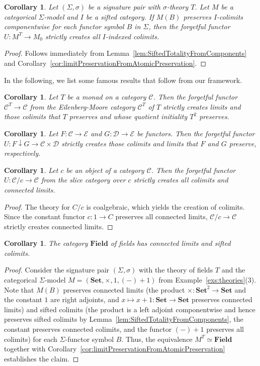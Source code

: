 \documentclass[11pt]{article}
\theoremstyle{plain}
\newtheorem{corollary}[theorem]{Corollary}
\theoremstyle{definition}
\numberwithin{equation}{section}
\newcommand{\C}{\mathcal{C}}
\newcommand{\D}{\mathcal{D}}
\newcommand{\E}{\mathcal{E}}
\newcommand{\Set}{\mathbf{Set}}
\begin{document}
\begin{corollary}\label{cor:liftingSifted}
   Let $(\Sigma, \sigma)$ be a signature pair with $\sigma$-theory $T$. Let $M$ be a categorical $\Sigma$-model and $I$ be a sifted category. If $M(B)$ preserves $I$-colimits componentwise for each functor symbol $B$ in $\Sigma$, then the forgetful functor $U\colon M^T\to M_0$ strictly creates all $I$-indexed colimits. 
\end{corollary}
\begin{proof}
   Follows immediately from Lemma~\ref{lem:SiftedTotalityFromComponents} and Corollary~\ref{cor:limitPreservationFromAtomicPreservation}.
\end{proof}
In the following, we list some famous results that follow from our framework.
\begin{corollary}
   Let $T$ be a monad on a category $\C$. Then the forgetful functor $\C^T\to \C$ from the Eilenberg-Moore category $\C^T$ of $T$ strictly creates limits and those colimits that $T$ preserves and whose quotient initiality $T^2$ preserves.
\end{corollary}

\begin{corollary}
   Let $F\colon \C\to \E$ and $G\colon \D\to \E$ be functors. Then the forgetful functor $U\colon F\downarrow G\to \C\times \D$ strictly creates those colimits and limits that $F$ and $G$ preserve, respectively.
\end{corollary}

\begin{corollary}
   Let $c$ be an object of a category $\C$. Then the forgetful functor $U\colon \C/c\to \C$ from the slice category over $c$ strictly creates all colimits and connected limits.
\end{corollary}
\begin{proof}
   The theory for $C/c$ is coalgebraic, which yields the creation of colimits. Since the constant functor $c\colon 1\to C$ preserves all connected limits, $\C/c\to \C$ strictly creates connected limits. 
\end{proof}
\begin{corollary}
    The category $\mathbf{Field}$ of fields has connected limits and sifted colimits.
\end{corollary}
\begin{proof}
    Consider the signature pair $(\Sigma,\sigma)$ with the theory of fields $T$ and the categorical $\Sigma$-model $M = (\Set, \times, 1, (-)+1)$ from Example~\ref{exs:theories}(3). Note that $M(B)$ preserves connected limits (the product $\times\colon \Set^2\to \Set$ and the constant $1$ are right adjoints, and $x\mapsto x+1\colon \Set\to \Set$ preserves connected limits) and sifted colimits (the product is a left adjoint componentwise and hence preserves sifted colimits by Lemma~\ref{lem:SiftedTotalityFromComponents}, the constant preserves connected colimits, and the functor $(-)+1$ preserves all colimits) for each $\Sigma$-functor symbol $B$. Thus, the equivalence $M^T\simeq \mathbf{Field}$ together with Corollary~\ref{cor:limitPreservationFromAtomicPreservation} establishes the claim.
\end{proof}
\end{document}
